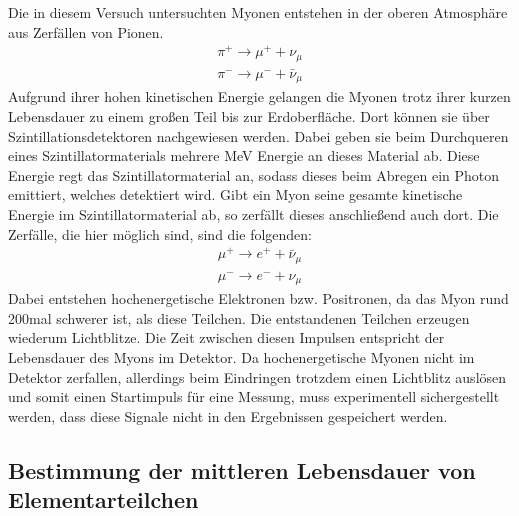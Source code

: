 %
Die in diesem Versuch untersuchten Myonen entstehen in der oberen Atmosphäre aus
Zerfällen von Pionen.
%
\begin{align}
  \pi^+\rightarrow\mu^++\nu_\mu \\
  \pi^-\rightarrow\mu^-+\bar{\nu}_\mu
\end{align}
%
Aufgrund ihrer hohen kinetischen Energie gelangen die Myonen trotz ihrer kurzen
Lebensdauer zu einem großen Teil bis zur Erdoberfläche. Dort können sie über
Szintillationsdetektoren nachgewiesen werden. Dabei geben sie beim Durchqueren
eines Szintillatormaterials mehrere MeV Energie an dieses Material ab. Diese
Energie regt das Szintillatormaterial an, sodass dieses beim Abregen ein Photon
emittiert, welches detektiert wird. Gibt ein Myon seine gesamte kinetische
Energie im Szintillatormaterial ab, so zerfällt dieses anschließend auch dort.
Die Zerfälle, die hier möglich sind, sind die folgenden:
%
\begin{align}
  \mu^+\rightarrow e^++\bar{\nu}_\mu \\
  \mu^-\rightarrow e^-+\nu_\mu
\end{align}
%
Dabei entstehen hochenergetische Elektronen bzw. Positronen, da das Myon rund
200mal schwerer ist, als diese Teilchen. Die entstandenen Teilchen erzeugen
wiederum Lichtblitze. Die Zeit zwischen diesen Impulsen entspricht der
Lebensdauer des Myons im Detektor. Da hochenergetische Myonen nicht im Detektor
zerfallen, allerdings beim Eindringen trotzdem einen Lichtblitz auslösen und
somit einen Startimpuls für eine Messung, muss experimentell sichergestellt
werden, dass diese Signale nicht in den Ergebnissen gespeichert werden.
%
\subsection{Bestimmung der mittleren Lebensdauer von Elementarteilchen}

